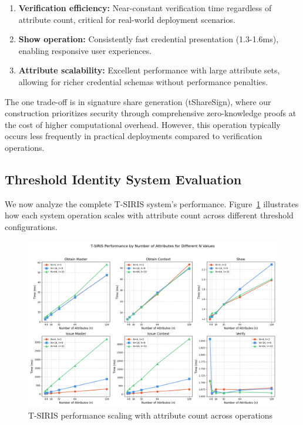 \begin{enumerate}
    \item \textbf{Verification efficiency:} Near-constant verification time regardless of attribute count, critical for real-world deployment scenarios.

    \item \textbf{Show operation:} Consistently fast credential presentation (1.3-1.6ms), enabling responsive user experiences.

    \item \textbf{Attribute scalability:} Excellent performance with large attribute sets, allowing for richer credential schemas without performance penalties.
\end{enumerate}

The one trade-off is in signature share generation (tShareSign), where our construction prioritizes security through comprehensive zero-knowledge proofs at the cost of higher computational overhead. However, this operation typically occurs less frequently in practical deployments compared to verification operations.











\subsection{Threshold Identity System Evaluation}
\label{sec:threshold-performance}

We now analyze the complete T-SIRIS system's performance. Figure~\ref{fig:chap5_tsiris_performance} illustrates how each system operation scales with attribute count across different threshold configurations.

\begin{figure}[!htb]
    \centering
    \includegraphics[width=\linewidth]{figures/chap5_tsiris_varyN_varyn_aggregate.png}
    \caption{T-SIRIS performance scaling with attribute count across operations}
    \label{fig:chap5_tsiris_performance}
\end{figure}

